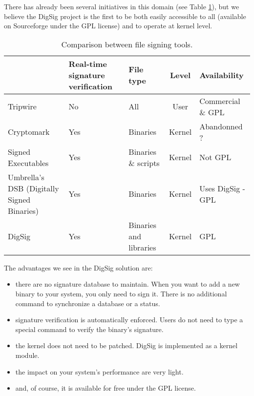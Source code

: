 \documentclass{article}
\begin{document}
There has already been several initiatives in this domain (see 
Table \ref{tab:userspace}), but we believe the DigSig project
is the first to be both easily accessible to all (available
on Sourceforge under the GPL license) and to operate at kernel level.

\begin{table}[ht]
\begin{center}
\begin{tabular}{|p{1.8cm}|p{1.6cm}|p{1.4cm}|c|p{3cm}|}
\hline
 & Real-time signature verification & File type & Level & Availability \\ 
\hline
Tripwire    & No           & All       & User      & Commercial  \& GPL \\ 
\hline
Cryptomark  & Yes          & Binaries  & Kernel    & Abandonned ? \\
\hline
Signed  Executables    & Yes          & Binaries \& scripts & Kernel    & Not GPL   \\     
\hline
Umbrella's \cite{umbrella} DSB (Digitally Signed Binaries) & Yes & Binaries & Kernel & Uses DigSig - GPL\\
\hline
DigSig      & Yes          & Binaries and libraries  & Kernel    & GPL \\ 
\hline
\end{tabular}
\caption{Comparison between file signing tools.}
\label{tab:userspace}
\end{center}
\end{table}

The advantages we see in the DigSig solution are:
\begin{itemize}
\item there are no signature database to maintain. When you want to add a new binary to your system, you only need to sign it. There is no additional command to synchronize a database or a status.

\item signature verification is automatically enforced. Users do not need to type a special command to verify the binary's signature. 

\item the kernel does not need to be patched. DigSig is implemented as a kernel module.

\item the impact on your system's performance are very light.

\item and, of course, it is available for free under the GPL license.

\end{itemize}
\end{document}
